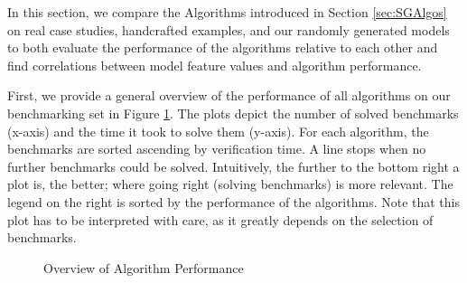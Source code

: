 In this section, we compare the Algorithms introduced in Section \ref{sec:SGAlgos} on real case studies, handcrafted examples, and our randomly generated models to both evaluate the 
performance of the algorithms relative to each other and find correlations between model feature values and algorithm performance.

First, we provide a general overview of the performance of all algorithms on our benchmarking set in Figure \ref{fig:AlgoPerformance}.
The plots depict the number of solved benchmarks (x-axis) and the time it took to solve them (y-axis). 
For each algorithm, the benchmarks are sorted ascending by verification time. A line stops when no further benchmarks could be solved.
Intuitively, the further to the bottom right a plot is, the better; where going right (solving benchmarks) is more relevant.
The legend on the right is sorted by the performance of the algorithms.
Note that this plot has to be interpreted with care, as it greatly depends on the selection of benchmarks.
\begin{figure}
    \centering
    \qquad
    \caption[Overview of Algorithm Performance]{Overview of Algorithm Performance}%
    \label{fig:AlgoPerformance}
\end{figure}


